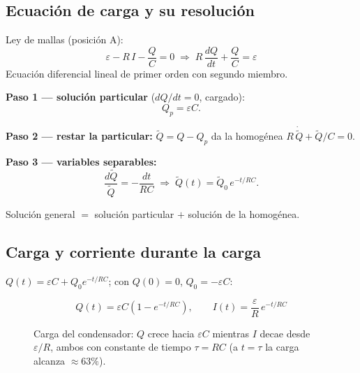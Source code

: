 \documentclass[12pt,a4paper]{article}
\begin{document}
\subsection{Ecuación de carga y su resolución}

Ley de mallas (posición A):
\[
\varepsilon - R\,I - \frac{Q}{C} = 0
\;\Longrightarrow\;
\boxed{R\,\frac{dQ}{dt} + \frac{Q}{C} = \varepsilon}
\]
Ecuación diferencial lineal de primer orden con segundo miembro.

\textbf{Paso 1 --- solución particular} ($dQ/dt=0$, cargado):
\[
Q_p = \varepsilon C.
\]

\textbf{Paso 2 --- restar la particular:} $\tilde{Q} = Q - Q_p$ da la
homogénea $R\,\dot{\tilde{Q}} + \tilde{Q}/C = 0$.

\textbf{Paso 3 --- variables separables:}
\[
\frac{d\tilde{Q}}{\tilde{Q}} = -\frac{dt}{RC}
\;\Longrightarrow\;
\tilde{Q}(t) = \tilde{Q}_0\, e^{-t/RC}.
\]

\begin{notebox}
  Solución general $=$ solución particular $+$ solución de la homogénea.
\end{notebox}

\subsection{Carga y corriente durante la carga}

$Q(t) = \varepsilon C + Q_0 e^{-t/RC}$; con $Q(0)=0$, $Q_0 = -\varepsilon
C$:

\begin{keybox}
  \[
  \boxed{Q(t) = \varepsilon C\left(1 - e^{-t/RC}\right)}, \qquad
  \boxed{I(t) = \frac{\varepsilon}{R}\, e^{-t/RC}}
  \]
\end{keybox}

\begin{figure}[H]
\centering
{}
\caption{Carga del condensador: $Q$ crece hacia $\varepsilon C$ mientras $I$
         decae desde $\varepsilon/R$, ambos con constante de tiempo
         $\tau = RC$ (a $t=\tau$ la carga alcanza $\approx 63\%$).}
\label{fig:clase14-rc-carga}
\end{figure}
\end{document}
